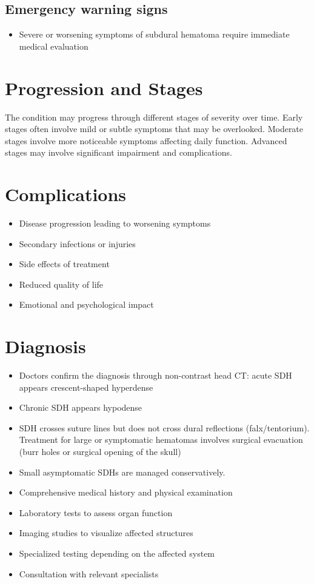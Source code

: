 \subsection{Emergency warning signs}
\begin{itemize}[noitemsep]
  \item Severe or worsening symptoms of subdural hematoma require immediate medical evaluation
\end{itemize}
\section{Progression and Stages}
The condition may progress through different stages of severity over time. Early stages often involve mild or subtle symptoms that may be overlooked. Moderate stages involve more noticeable symptoms affecting daily function. Advanced stages may involve significant impairment and complications.
\section{Complications}
\begin{itemize}[noitemsep]
  \item Disease progression leading to worsening symptoms
  \item Secondary infections or injuries
  \item Side effects of treatment
  \item Reduced quality of life
  \item Emotional and psychological impact
\end{itemize}
\section{Diagnosis}
\begin{itemize}[noitemsep]
  \item Doctors confirm the diagnosis through non-contrast head CT: acute SDH appears crescent-shaped hyperdense
  \item Chronic SDH appears hypodense
  \item SDH crosses suture lines but does not cross dural reflections (falx/tentorium). Treatment for large or symptomatic hematomas involves surgical evacuation (burr holes or surgical opening of the skull)
  \item Small asymptomatic SDHs are managed conservatively.
  \item Comprehensive medical history and physical examination
  \item Laboratory tests to assess organ function
  \item Imaging studies to visualize affected structures
  \item Specialized testing depending on the affected system
  \item Consultation with relevant specialists
\end{itemize}
